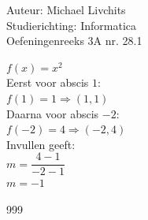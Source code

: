 \documentclass[a4paper]{article}
\begin{document}
  
\noindent \large Auteur: Michael Livchits \\
\noindent \large Studierichting: Informatica\\
\noindent \large Oefeningenreeks 3A nr. 28.1\\

\medskip

\normalsize

$f(x)=x^2$\\

Eerst voor abscis $1$:\\

$f(1) = 1 \Rightarrow (1,1)$\\

Daarna voor abscis $-2$:\\

$f(-2) = 4 \Rightarrow (-2,4)$\\

Invullen geeft:\\

$m = \dfrac{4-1}{-2-1}$\\

$m = -1$\\

\begin{thebibliography}{999}
\end{thebibliography}
\end{document}
